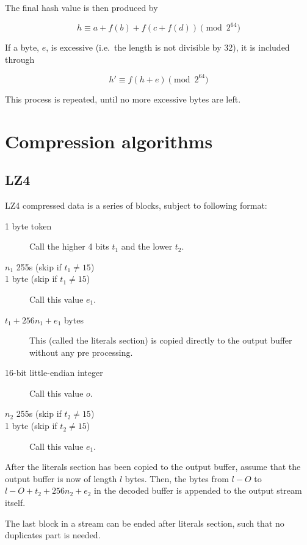 \documentclass[11pt,a4paper]{report}
\begin{document}
        The final hash value is then produced by

        $$h \equiv a + f(b) + f(c + f(d)) \pmod{2^{64}}$$

        If a byte, $e$, is excessive (i.e.\ the length is not divisible by 32),
        it is included through

        $$h' \equiv f(h + e) \pmod{2^{64}}$$

        This process is repeated, until no more excessive bytes are left.

    \section{Compression algorithms}
        \subsection{LZ4}
        \label{compression:lz4}
        LZ4 compressed data is a series of blocks, subject to following format:

        \begin{description}
            \item [1 byte token] Call the higher 4 bits $t_1$ and the lower $t_2$.
            \item [$n_1$ 255s (skip if $t_1 \neq 15$)]
            \item [1 byte (skip if $t_1 \neq 15$)] Call this value $e_1$.
            \item [$t_1 + 256n_1 + e_1$ bytes] This (called the literals
                section) is copied directly to the output buffer without any
                pre processing.
            \item [16-bit little-endian integer] Call this value $o$.
            \item [$n_2$ 255s (skip if $t_2 \neq 15$)]
            \item [1 byte (skip if $t_2 \neq 15$)] Call this value $e_1$.
        \end{description}

        After the literals section has been copied to the output buffer, assume
        that the output buffer is now of length $l$ bytes. Then, the bytes from
        $l - O$ to $l - O + t_2 + 256n_2 + e_2$ in the decoded buffer is
        appended to the output stream itself.

        The last block in a stream can be ended after literals
        section, such that no duplicates part is needed.
\end{document}
